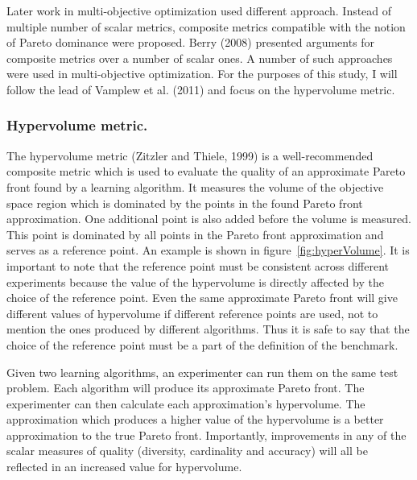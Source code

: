 Later work in multi-objective optimization used different approach. Instead of multiple number of scalar metrics, composite metrics compatible with the notion of Pareto dominance were proposed. Berry (2008)\nocite{berry2008phd} presented arguments for composite metrics over a number of scalar ones. A number of such approaches were used in multi-objective optimization. For the purposes of this study, I will follow the lead of Vamplew et al. (2011)\nocite{vamplew2011empirical} and focus on the hypervolume metric.

\subsubsection{Hypervolume metric.}

The hypervolume metric (Zitzler and Thiele, 1999\nocite{zitzler1999pareto}) is a well-recommended composite metric which is used to evaluate the quality of an approximate Pareto front found by a learning algorithm. It measures the volume of the objective space region which is dominated by the points in the found Pareto front approximation. One additional point is also added before the volume is measured. This point is dominated by all points in the Pareto front approximation and serves as a reference point. An example is shown in figure~\ref{fig:hyperVolume}. It is important to note that the reference point must be consistent across different experiments because the value of the hypervolume is directly affected by the choice of the reference point. Even the same approximate Pareto front will give different values of hypervolume if different reference points are used, not to mention the ones produced by different algorithms. Thus it is safe to say that the choice of the reference point must be a part of the definition of the benchmark.

Given two learning algorithms, an experimenter can run them on the same test problem. Each algorithm will produce its approximate Pareto front. The experimenter can then calculate each approximation's hypervolume. The approximation which produces a higher value of the hypervolume is a better approximation to the true Pareto front. Importantly, improvements in any of the scalar measures of quality (diversity, cardinality and accuracy) will all be reflected in an increased value for hypervolume.

